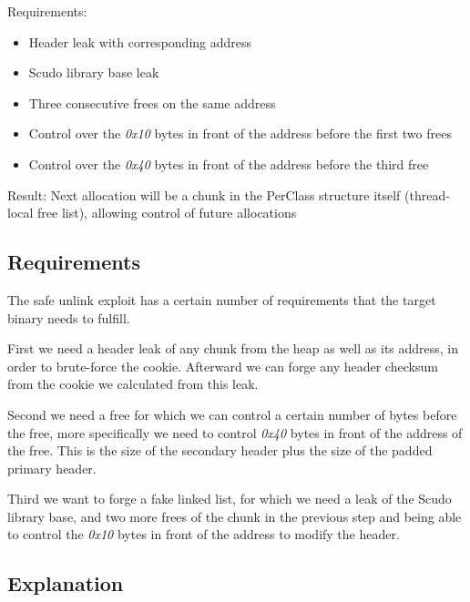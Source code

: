 \documentclass[a4paper,11pt,oneside]{report}
\begin{document}
Requirements:
\begin{itemize}
\item Header leak with corresponding address
\item Scudo library base leak
\item Three consecutive frees on the same address
\item Control over the \emph{0x10} bytes in front of the address before the first two
  frees
\item Control over the \emph{0x40} bytes in front of the address before the third free
\end{itemize}

Result: Next allocation will be a chunk in the PerClass structure itself (thread-local
free list), allowing control of future allocations


\subsection{Requirements}

The safe unlink exploit has a certain number of requirements that the target binary needs
to fulfill.

First we need a header leak of any chunk from the heap as well as its address, in
order to brute-force the cookie. Afterward we can forge any header checksum from the
cookie we calculated from this leak.

Second we need a free for which we can control a certain number of bytes before the free,
more specifically we need to control \emph{0x40} bytes in front of the address of the
free. This is the size of the secondary header plus the size of the padded primary header.

Third we want to forge a fake linked list, for which we need a leak of the Scudo library
base, and two more frees of the chunk in the previous step and
being able to control the \emph{0x10} bytes in front of the address to modify the
header.

\subsection{Explanation}
\end{document}
